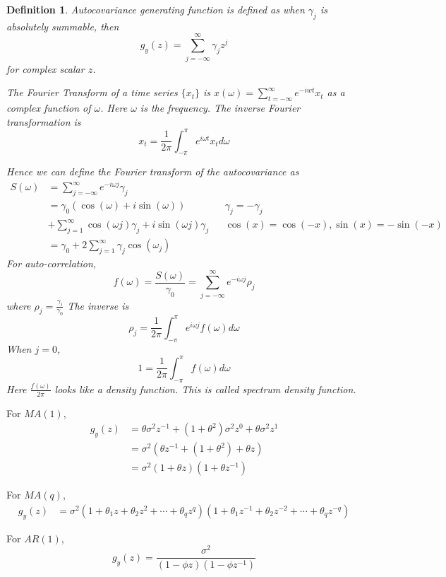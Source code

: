 \documentclass[11pt, a4paper, oneside]{article}
\newtheorem{mydef}{Definition}
\theoremstyle{definition}
\theoremstyle{proposition}
\theoremstyle{corollary}
\theoremstyle{lemma}
\theoremstyle{theorem}
\begin{document}
\begin{mydef}
Autocovariance generating function is defined as 
when $\gamma_j$ is absolutely summable, then $$g_y(z) = \sum_{j=-\infty}^{\infty} \gamma_j z^j$$ for complex scalar $z$. 

The Fourier Transform of a time series $\{x_t\}$ is $x(\omega) = \sum_{t = -\infty}^{\infty} e^{-iwt}x_t$ as a complex function of $\omega$. Here $\omega$ is the frequency. The inverse Fourier transformation is $$x_t = \frac{1}{2\pi}\int_{-\pi}^{\pi}e^{i\omega t}x_td\omega$$

Hence we can define the Fourier transform of the autocovariance as 
\begin{align*}
S(\omega) &= \sum_{j = -\infty}^{\infty}e^{-i\omega j}\gamma_j \\
&= \gamma_0 (\cos(\omega) + i \sin(\omega)) && \gamma_j = -\gamma_j\\ 
&+\sum_{j=1}^{\infty}\cos(\omega j)\gamma_j + i \sin( \omega j) \gamma_j && \cos(x) = \cos(-x), \sin(x) = - \sin(-x)\\
&=\gamma_0 + 2\sum_{j=1}^{\infty}\gamma_j \cos(\omega_j)
\end{align*}
For auto-correlation,
$$f(\omega) = \frac{S(\omega)}{\gamma_0} = \sum_{j=-\infty}^{\infty} e^{-i\omega j}\rho_j$$ where $\rho_j = \frac{\gamma_i}{\gamma_0}$
The inverse is 
$$\rho_j = \frac{1}{2\pi}\int_{-\pi}^{\pi}e^{i\omega j}f(\omega) d\omega$$ 
When $j = 0$, $$1 = \frac{1}{2\pi}\int_{-\pi}^{\pi}f(\omega) d\omega$$
Here $\frac{f(\omega)}{2\pi}$ looks like a density function. This is called spectrum density function. 
\end{mydef}

For $MA(1)$, \begin{align*}
g_y(z) & = \theta\sigma^2z^{-1} + (1+\theta^2)\sigma^2 z^0 + \theta\sigma^2z^1 \\
&= \sigma^2(\theta z^{-1} + (1 + \theta^2) + \theta z)\\
&= \sigma^2(1 + \theta z)(1 + \theta z^{-1})
\end{align*}

For $MA(q)$, \begin{align*}
g_y(z) & = \sigma^2(1 + \theta_1 z + \theta_2 z^2 + \cdots + \theta_q z^q)(1 + \theta_1 z^{-1}+\theta_2z^{-2} + \cdots + \theta_q z^{-q})
\end{align*}

For $AR(1)$, $$g_y(z) = \frac{\sigma^2}{(1- \phi z)(1- \phi z^{-1})}$$
\end{document}
